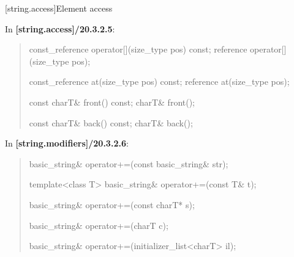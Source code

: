 \documentclass{wg21}
\begin{document}
[string.access]{Element access}

In \textbf{[string.access]/20.3.2.5}:
\begin{quote}
\begin{itemdecl}
const_reference operator[](size_type pos) const;
reference       operator[](size_type pos);
\end{itemdecl}

\begin{itemdecl}
const_reference at(size_type pos) const;
reference       at(size_type pos);
\end{itemdecl}

\begin{itemdecl}
const charT& front() const;
charT& front();
\end{itemdecl}

\begin{itemdecl}
const charT& back() const;
charT& back();
\end{itemdecl}
\end{quote}


In \textbf{[string.modifiers]/20.3.2.6}:
\begin{quote}
\begin{itemdecl}
basic_string& operator+=(const basic_string& str);
\end{itemdecl}

\begin{itemdecl}
template<class T>
  basic_string& operator+=(const T& t);
\end{itemdecl}

\begin{itemdecl}
basic_string& operator+=(const charT* s);
\end{itemdecl}

\begin{itemdecl}
basic_string& operator+=(charT c);
\end{itemdecl}

\begin{itemdecl}
basic_string& operator+=(initializer_list<charT> il);
\end{itemdecl}
\end{quote}
\end{document}
